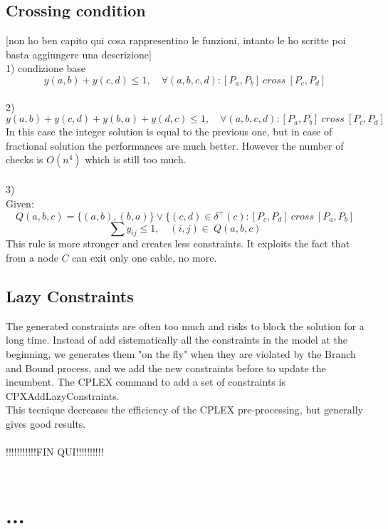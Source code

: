 \subsection{Crossing condition}
[non ho ben capito qui cosa rappresentino le funzioni, intanto le ho scritte poi basta aggiungere una descrizione]\\
1) condizione base
\[
y(a,b)+ y(c,d) \leq 1, \quad \forall (a,b,c,d): [P_a, P_b] \ cross \ [P_c, P_d]
\]
 \\
2) 
\[
y(a,b)+ y(c,d) + y(b,a) + y(d,c) \leq 1, \quad \forall (a,b,c,d): [P_a, P_b] \ cross \ [P_c, P_d]
\]
In this case the integer solution is equal to the previous one, but in case of fractional solution the performances are much better. However the number of checks is $O(n^4)$ which is still too much.\\ \\

3)\\ 
Given:
\[
Q(a,b,c) = \{(a,b), (b,a) \} \vee \{ (c,d) \in \delta^+ (c): [P_c, P_d] \ cross \ [P_a, P_b]
\]
\[
\sum y_{ij} \leq 1, \quad (i,j) \in \ Q(a,b,c)
\]
This rule is more stronger and creates less constraints. It exploits the fact that from a node $C$ can exit only one cable, no more. 

\subsection{Lazy Constraints}
The generated constraints are often too much and risks to block the solution for a long time. 
Instead of add sistematically all the constraints in the model at the beginning, we generates them "on the fly" when they are violated by the Branch and Bound process, and we add the new constraints before to update the incumbent. The CPLEX command to add a set of constraints is CPXAddLazyConstraints. \\
This tecnique decreases the efficiency of the CPLEX pre-processing, but generally gives good results. \\\\

!!!!!!!!!!!FIN QUI!!!!!!!!!!\\\\


\section{...}
